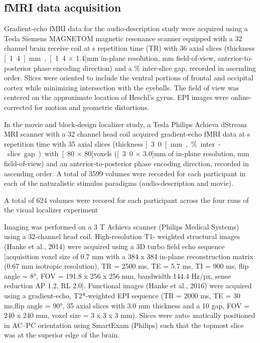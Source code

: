\subsection{fMRI data acquisition}


Gradient-echo fMRI data for the audio-description study were acquired using a
\unit[7]{Tesla} Siemens MAGNETOM magnetic resonance scanner equipped with a 32
channel brain receive coil at \unit[2]{s} repetition time (TR) with 36 axial
slices (thickness \unit[1.4]{mm}, \unit[1.4 $\times$ 1.4]{mm} in-plane
resolution, \unit[224]{mm} field-of-view, anterior-to-posterior phase encoding
direction) and a \unit[10]{\%} inter-slice gap, recorded in ascending order.
Slices were oriented to include the ventral portions of frontal and occipital
cortex while minimizing intersection with the eyeballs.
The field of view was centered on the approximate location of Heschl's gyrus.
EPI images were online-corrected for motion and geometric distortions.

In the movie and block-design localizer study, a \unit[3]{Tesla} Philips Achieva
dStream MRI scanner with a 32 channel head coil acquired gradient-echo fMRI data
at \unit[2]{s} repetition time with
35 axial slices (thickness \unit[3.0]{mm}, \unit[10]{\%} inter-slice gap) with
\unit[80 $\times$ 80]{voxels} (\unit[3.0 $\times$ 3.0]{mm} of in-plane
resolution, \unit[240]{mm} field-of-view) and an anterior-to-posterior phase
encoding direction, recorded in ascending order.
A total of 3599 volumes were recorded for each participant in each of the
naturalistic stimulus paradigms (audio-description and movie).

A total of 624 volumes were recored for each participant across the four runs of
the visual localizer experiment

%
Imaging was performed on a 3 T Achieva
scanner (Philips Medical Systems) using a 32-channel head coil.  High-resolution
T1- weighted structural images (Hanke et al., 2014) were acquired using a 3D
turbo field echo sequence [acquisition voxel size of 0.7 mm with a 384 x 384
in-plane reconstruction matrix (0.67 mm isotropic resolution), TR = 2500 ms, TE
= 5.7 ms, TI = 900 ms, flip angle = 8°, FOV = 191.8 x 256 x 256 mm, bandwidth
144.4 Hz/px, sense reduction AP 1.2, RL 2.0]. Functional images (Hanke et al.,
2016) were acquired using a gradient-echo, T2*-weighted EPI sequence (TR = 2000
ms, TE = 30 ms,flip angle = 90°, 35 axial slices with 3.0 mm thickness and a 10%
gap, FOV = 240 x 240 mm, voxel size = 3 x 3 x 3 mm). Slices were auto- matically
positioned in AC–PC orientation using SmartExam (Philips) such that the topmost
slice was at the superior edge of the brain.


